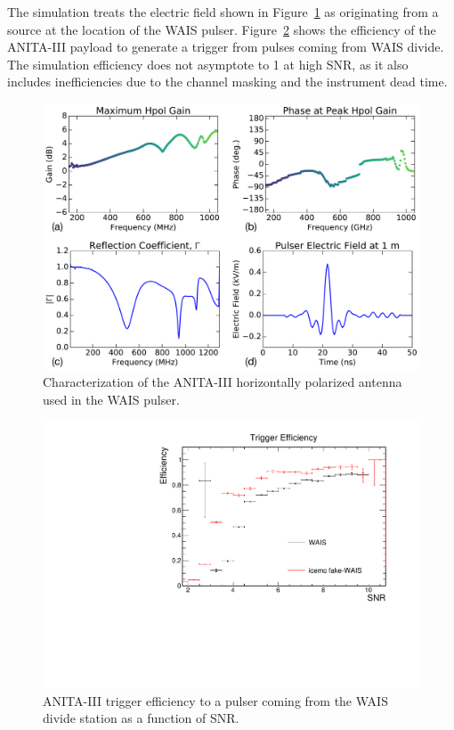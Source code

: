 The simulation treats the electric field shown in Figure~\ref{fig:waisPulser} as originating from a source at the location of the WAIS pulser. Figure~\ref{fig:waisEff} shows the efficiency of the ANITA-III payload to generate a trigger from pulses coming from WAIS divide. The simulation efficiency does not asymptote to 1 at high SNR, as it also includes inefficiencies due to the channel masking and the instrument dead time. 

\begin{figure}
\centering
\includegraphics[width=\linewidth]{./Figs/waisPulser.pdf}
\caption{Characterization of the ANITA-III horizontally polarized antenna used in the WAIS pulser.}
\label{fig:waisPulser}
\end{figure}

\begin{figure}
\centering
\includegraphics[width=.5\linewidth]{./Figs/Efficiency_WAIS.pdf}
\caption{ANITA-III trigger efficiency to a pulser coming from the WAIS divide station as a function of SNR.}
\label{fig:waisEff}
\end{figure}

